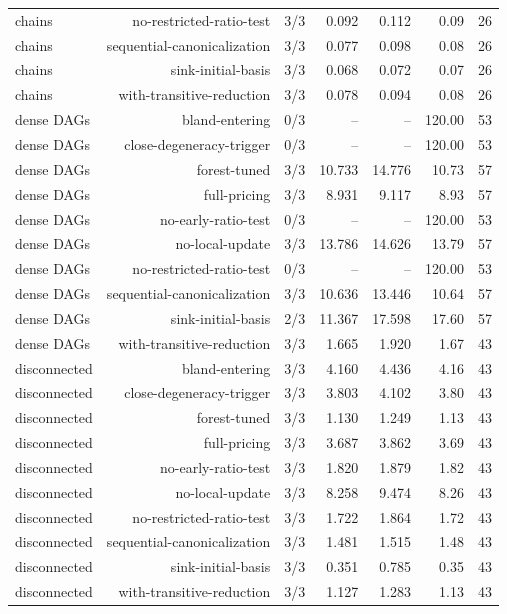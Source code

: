 {\begin{longtable}{lrrrrrr}
chains & no-restricted-ratio-test & 3/3 & 0.092 & 0.112 & 0.09 & 26 \\
chains & sequential-canonicalization & 3/3 & 0.077 & 0.098 & 0.08 & 26 \\
chains & sink-initial-basis & 3/3 & 0.068 & 0.072 & 0.07 & 26 \\
chains & with-transitive-reduction & 3/3 & 0.078 & 0.094 & 0.08 & 26 \\
dense DAGs & bland-entering & 0/3 & -- & -- & 120.00 & 53 \\
dense DAGs & close-degeneracy-trigger & 0/3 & -- & -- & 120.00 & 53 \\
dense DAGs & forest-tuned & 3/3 & 10.733 & 14.776 & 10.73 & 57 \\
dense DAGs & full-pricing & 3/3 & 8.931 & 9.117 & 8.93 & 57 \\
dense DAGs & no-early-ratio-test & 0/3 & -- & -- & 120.00 & 53 \\
dense DAGs & no-local-update & 3/3 & 13.786 & 14.626 & 13.79 & 57 \\
dense DAGs & no-restricted-ratio-test & 0/3 & -- & -- & 120.00 & 53 \\
dense DAGs & sequential-canonicalization & 3/3 & 10.636 & 13.446 & 10.64 & 57 \\
dense DAGs & sink-initial-basis & 2/3 & 11.367 & 17.598 & 17.60 & 57 \\
dense DAGs & with-transitive-reduction & 3/3 & 1.665 & 1.920 & 1.67 & 43 \\
disconnected & bland-entering & 3/3 & 4.160 & 4.436 & 4.16 & 43 \\
disconnected & close-degeneracy-trigger & 3/3 & 3.803 & 4.102 & 3.80 & 43 \\
disconnected & forest-tuned & 3/3 & 1.130 & 1.249 & 1.13 & 43 \\
disconnected & full-pricing & 3/3 & 3.687 & 3.862 & 3.69 & 43 \\
disconnected & no-early-ratio-test & 3/3 & 1.820 & 1.879 & 1.82 & 43 \\
disconnected & no-local-update & 3/3 & 8.258 & 9.474 & 8.26 & 43 \\
disconnected & no-restricted-ratio-test & 3/3 & 1.722 & 1.864 & 1.72 & 43 \\
disconnected & sequential-canonicalization & 3/3 & 1.481 & 1.515 & 1.48 & 43 \\
disconnected & sink-initial-basis & 3/3 & 0.351 & 0.785 & 0.35 & 43 \\
disconnected & with-transitive-reduction & 3/3 & 1.127 & 1.283 & 1.13 & 43 \\

\end{longtable}}
